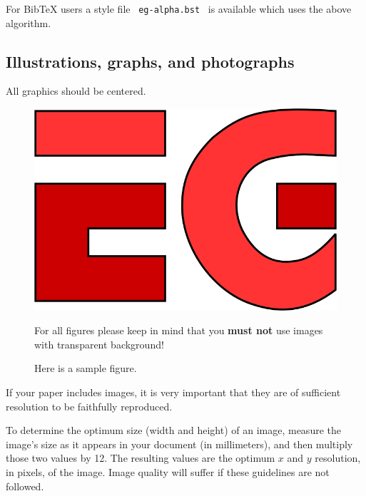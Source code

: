 \documentclass{egpubl}
\begin{document}
For BibTeX users a style file \ \texttt{eg-alpha.bst} \ is available which
uses the above algorithm.

\subsection{Illustrations, graphs, and photographs}

All graphics should be centered.

\begin{figure}[htb]
  \centering
  \includegraphics[width=.8\linewidth]{sampleFig}
  \parbox[t]{.9\columnwidth}{\relax
           For all figures please keep in mind that you \textbf{must not}
           use images with transparent background! 
           }
  \caption{\label{fig:firstExample}
           Here is a sample figure.}
\end{figure}

If your paper includes images, it is very important that they are of
sufficient resolution to be faithfully reproduced.

To determine the optimum size (width and height) of an image, measure
the image's size as it appears in your document (in millimeters), and
then multiply those two values by 12. The resulting values are the
optimum $x$ and $y$ resolution, in pixels, of the image. Image quality
will suffer if these guidelines are not followed.
\end{document}
